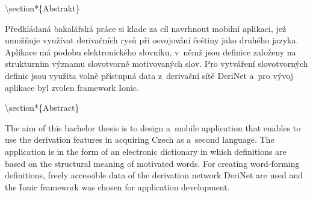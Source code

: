 \textbackslash section*\{Abstrakt\}

Předkládaná bakalářská práce si klade za cíl navrhnout mobilní aplikaci, jež umožňuje využívat derivačních rysů při osvojování češtiny jako druhého jazyka. Aplikace má podobu elektronického slovníku, v~němž jsou definice založeny na strukturním významu slovotvorně motivovaných slov. Pro vytváření slovotvorných definic jsou využita volně přístupná data z~derivační sítě DeriNet a~pro vývoj aplikace byl zvolen framework Ionic.

\textbackslash section*\{Abstract\}

The aim of this bachelor thesis is to design a~mobile application that enables to use the derivation features in acquiring Czech as a~second language. The application is in the form of an electronic dictionary in which definitions are based on the structural meaning of motivated words. For creating word-forming definitions, freely accessible data of the derivation network DeriNet are used and the Ionic framework was chosen for application development.
